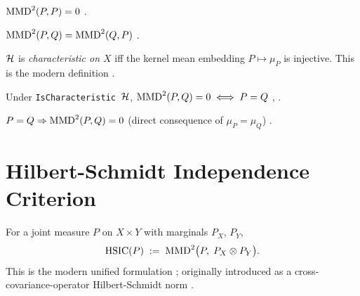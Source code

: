 \begin{thm}
\label{thm:mmd-sq-self}
  \leanok
$\mathrm{MMD}^2(P, P) = 0$ \cite[Lemma~5]{gretton2012kernel}.
\end{thm}

\begin{thm}
\label{thm:mmd-sq-comm}
  \leanok
$\mathrm{MMD}^2(P, Q) = \mathrm{MMD}^2(Q, P)$ \cite[Lemma~5]{gretton2012kernel}.
\end{thm}

\begin{defn}
\label{def:is-characteristic}
  \leanok
$\mathcal{H}$ is \emph{characteristic on $X$} iff the kernel mean embedding
$P \mapsto \mu_P$ is injective. This is the modern definition
\cite[Defn.\ 6]{sriperumbudur2010hilbert}.
\end{defn}

\begin{thm}
\label{thm:mmd-zero-iff}
  \leanok
Under \texttt{IsCharacteristic}~$\mathcal{H}$,
$\mathrm{MMD}^2(P, Q) = 0 \iff P = Q$
\cite[Thm~8]{sriperumbudur2010hilbert}, \cite[Thm~5]{gretton2012kernel}.
\end{thm}

\begin{thm}
\label{thm:mmd-eq-zero}
  \leanok
$P = Q \Rightarrow \mathrm{MMD}^2(P, Q) = 0$ (direct consequence of
$\mu_P = \mu_Q$) \cite[Lemma~5]{gretton2012kernel}.
\end{thm}

\section{Hilbert-Schmidt Independence Criterion}\label{sec:hsic}

\begin{defn}
\label{def:hsic}
  \leanok
For a joint measure $P$ on $X \times Y$ with marginals $P_X$, $P_Y$,
\[
  \mathrm{HSIC}(P) \;:=\; \mathrm{MMD}^2\bigl(P,\; P_X \otimes P_Y\bigr).
\]
This is the modern unified formulation \cite[Thm 24]{sriperumbudur2010hilbert};
originally introduced as a cross-covariance-operator Hilbert-Schmidt
norm \cite{gretton2005hsic}.
\end{defn}

